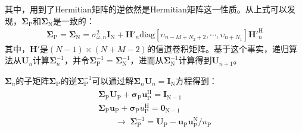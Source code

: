 其中，用到了Hermitian矩阵的逆依然是Hermitian矩阵这一性质。从上式可以发现，$\boldsymbol{\Sigma}_{\mathrm{P}}$和$\boldsymbol{\Sigma}_{\mathrm{N}}$是一致的：
\begin{eqnarray}
    \boldsymbol{\Sigma}_{\mathrm{P}}=\boldsymbol{\Sigma}_{\mathrm{N}}=\sigma_{\omega,n}^2\mathbf{I}_{\mathrm{N}}+{\mathbf{H}}'_n\mathrm{diag}[\upsilon_{n-M+N_2+2},\cdots,\upsilon_{n+N_1}]{{\mathbf{H}}'}_n^{\mathrm{H}}
    \label{equ:3.26}
\end{eqnarray}
其中，${\mathbf{H}}'$是$(N-1)\times(N+M-2)$的信道卷积矩阵。基于这个事实，递归算法从$\mathbf{U}_n$计算$\boldsymbol{\Sigma}_n^{-1}$，并令$\boldsymbol{\Sigma}_{\mathrm{P}}^{-1}=\boldsymbol{\Sigma}_{\mathrm{N}}^{-1}$，进而从$\boldsymbol{\Sigma}_{\mathrm{N}}^{-1}$计算得到$\mathbf{U}_{n+1}$。

$\boldsymbol{\Sigma}_{n}$的子矩阵$\boldsymbol{\Sigma}_{\mathrm{P}}$的逆$\boldsymbol{\Sigma}_{\mathrm{P}}^{-1}$可以通过解$\boldsymbol{\Sigma}_{n}\mathbf{U}_n=\mathbf{I}_{\mathrm{N}}$方程得到：
\begin{eqnarray}
    \begin{array}{c}
        \boldsymbol{\Sigma}_{\mathrm{P}}\mathbf{U}_{\mathrm{P}}+\boldsymbol{\sigma}_{\mathrm{P}}\mathbf{u}_{\mathrm{P}}^{\mathrm{H}}=\mathbf{I}_{\mathrm{N}-1}\\
     \boldsymbol{\Sigma}_{\mathrm{P}}\mathbf{u}_{\mathrm{P}}+\boldsymbol{\sigma}_{\mathrm{P}}u_{\mathrm{P}}^{\mathrm{H}}=\mathbf{0}_{\mathrm{N}-1}\\
     \qquad\rightarrow\;\boldsymbol{\Sigma}_{\mathrm{P}}^{-1}=\mathbf{U}_{\mathrm{P}}-\mathbf{u}_{\mathrm{P}}\mathbf{u}_{\mathrm{P}}^{\mathrm{N}}/u_{\mathrm{P}}
    \end{array}
    \label{equ:3.27}
\end{eqnarray}

